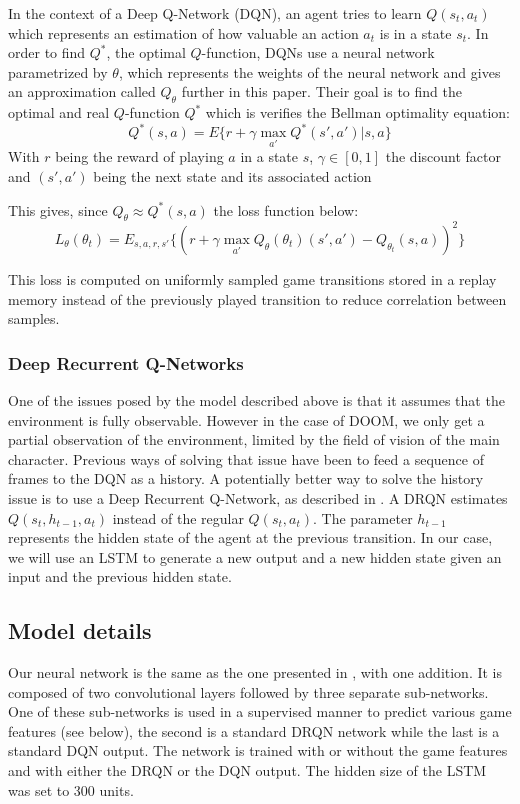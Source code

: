 \documentclass[letterpaper]{article}
\begin{document}
In the context of a Deep Q-Network (DQN), an agent tries to learn
$Q(s_t,a_t)$ which represents an
estimation of how valuable an action $a_t$ is in a state $s_t$. In order to
find $Q^*$, the optimal $Q$-function, DQNs use a neural network
parametrized by $\theta$, which represents the weights of the neural network
and gives an approximation called $Q_\theta$ further in this paper. Their goal
is to find the optimal and real $Q$-function $Q^*$ which is verifies the Bellman
optimality equation:
$$ Q^*(s,a) = E\{r + \gamma \max_{a'}Q^*(s',a')|s,a\} $$
With $r$ being the reward of playing $a$ in a state $s$, $\gamma\in [0,1]$ the
discount factor and $(s',a')$ being the next state and its associated action

This gives, since $Q_{\theta} \approx Q^*(s,a)$ the loss function below:
$$ L_\theta(\theta_t) = E_{s,a,r,s'}\{(r +\gamma \max_{a'}Q_\theta(\theta_t)(s' , a' )-Q_{\theta_t}(s,a))^2\}$$

This loss is computed on uniformly sampled game transitions stored in a
replay memory instead of the previously played transition to reduce correlation
between samples.


\subsubsection{Deep Recurrent Q-Networks}
One of the issues posed by the model described above is that it assumes that the
environment is fully observable. However in the case of DOOM, we only get a
partial
observation of the environment, limited by the field of vision of the main
character. Previous ways of solving that issue have been to feed a sequence of
frames to the DQN as a history.
A potentially better way to solve the history issue is to use a Deep Recurrent
Q-Network, as described in \citep{Hausknecht2015}. A DRQN
estimates $Q(s_t,h_{t-1},a_t)$ instead of the regular $Q(s_t,a_t)$. The
parameter $h_{t-1}$ represents the hidden state of the agent at the previous
transition. In our case, we will use an LSTM to generate a new output and a new
hidden state given an input and the previous hidden state.

\subsection{Model details}
Our neural network is the same as the one presented in \citep{Lample2016},
with one addition.
It is composed of two convolutional layers followed by three separate
sub-networks. One of these sub-networks is used in a supervised manner to
predict various game features (see below), the second is a standard
DRQN network while the last is a standard DQN output. The network is trained
with or without the game features and with either the DRQN or the DQN output.
The hidden size of the LSTM was set to 300 units.
\end{document}
